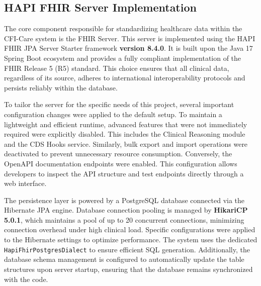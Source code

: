 \subsection{HAPI FHIR Server Implementation}
\label{subsec:hapi_fhir_server}

The core component responsible for standardizing healthcare data within the
CFI-Care system is the FHIR Server. This server is implemented using the HAPI
FHIR JPA Server Starter framework \textbf{version 8.4.0}. It is built upon
the Java 17 Spring Boot ecosystem and provides a fully compliant implementation
of the FHIR Release 5 (R5) standard. This choice ensures that all clinical
data, regardless of its source, adheres to international interoperability
protocols and persists reliably within the database.

To tailor the server for the specific needs of this project, several important
configuration changes were applied to the default setup. To maintain a
lightweight and efficient runtime, advanced features that were not immediately
required were explicitly disabled. This includes the Clinical Reasoning module
and the CDS Hooks service. Similarly, bulk export and import operations were
deactivated to prevent unnecessary resource consumption. Conversely, the
OpenAPI documentation endpoints were enabled. This configuration allows
developers to inspect the API structure and test endpoints directly through a
web interface.

The persistence layer is powered by a PostgreSQL database connected via the
Hibernate JPA engine. Database connection pooling is managed by
\textbf{HikariCP 5.0.1}, which maintains a pool of up to 20 concurrent
connections, minimizing connection overhead under high clinical load. Specific
configurations were applied to the Hibernate settings to optimize performance.
The system uses the dedicated \texttt{HapiFhirPostgresDialect} to ensure
efficient SQL generation. Additionally, the database schema management is
configured to automatically update the table structures upon server startup,
ensuring that the database remains synchronized with the code.


